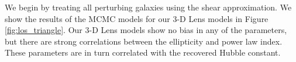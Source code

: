We begin by treating all perturbing galaxies using the shear approximation. We show the results of the MCMC models for our 3-D Lens models in Figure \ref{fig:los_triangle}. Our 3-D Lens models show no bias in any of the parameters, but there are strong correlations between the ellipticity and power law index. These parameters are in turn correlated with the recovered Hubble constant. 